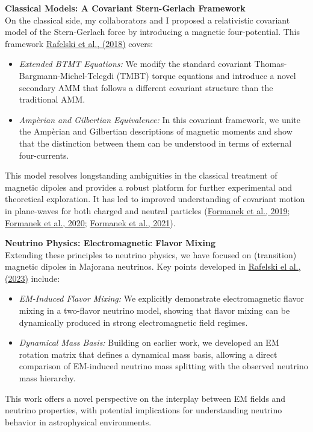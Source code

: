 \documentclass[11pt]{article}
\begin{document}
{\noindent\Large\textbf{Classical Models: A Covariant Stern-Gerlach Framework}}\\
On the classical side, my collaborators and I proposed a relativistic covariant model of the Stern-Gerlach force by introducing a magnetic four-potential. This framework \href{https://doi.org/10.1140/epjc/s10052-017-5493-2}{Rafelski et al., (2018)} covers:
\begin{itemize}[leftmargin=1.5em,nosep]
    \item \emph{Extended BTMT Equations:} We modify the standard covariant Thomas-Bargmann-Michel-Telegdi (TMBT) torque equations and introduce a novel secondary AMM that follows a different covariant structure than the traditional AMM.
    \item \emph{Ampèrian and Gilbertian Equivalence:} In this covariant framework, we unite the Ampèrian and Gilbertian descriptions of magnetic moments and show that the distinction between them can be understood in terms of external four-currents.
\end{itemize}
This model resolves longstanding ambiguities in the classical treatment of magnetic dipoles and provides a robust platform for further experimental and theoretical exploration. It has led to improved understanding of covariant motion in plane-waves for both charged and neutral particles (\href{https://doi.org/10.1088/1361-6587/ab242e}{Formanek et al., 2019}; \href{https://doi.org/10.1103/PhysRevD.102.056015}{Formanek et al., 2020}; \href{https://doi.org/10.1103/PhysRevA.103.052218}{Formanek et al., 2021}).

\vspace{1em}

{\noindent\Large\textbf{Neutrino Physics: Electromagnetic Flavor Mixing}}\\
Extending these principles to neutrino physics, we have focused on (transition) magnetic dipoles in Majorana neutrinos. Key points developed in \href{https://doi.org/10.1142/S0217751X23501634}{Rafelski el al., (2023)} include:
\begin{itemize}[leftmargin=1.5em,nosep]
    \item \emph{EM-Induced Flavor Mixing:} We explicitly demonstrate electromagnetic flavor mixing in a two-flavor neutrino model, showing that flavor mixing can be dynamically produced in strong electromagnetic field regimes.
    \item \emph{Dynamical Mass Basis:} Building on earlier work, we developed an EM rotation matrix that defines a dynamical mass basis, allowing a direct comparison of EM-induced neutrino mass splitting with the observed neutrino mass hierarchy.
\end{itemize}
This work offers a novel perspective on the interplay between EM fields and neutrino properties, with potential implications for understanding neutrino behavior in astrophysical environments.
\end{document}
